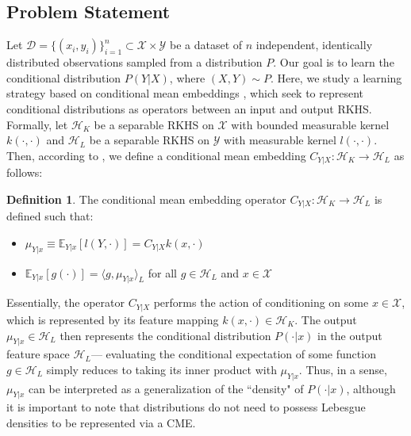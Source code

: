 \documentclass[accepted]{article}
\theoremstyle{definition}
\newtheorem{definition}{Definition}[section]
\begin{document}
\subsection{Problem Statement}
Let $\mathcal{D} = \{(x_i, y_i)\}_{i = 1}^n \subset \mathcal{X} \times \mathcal{Y}$ be a dataset of $n$ independent, identically distributed observations sampled from a distribution $P$. Our goal is to learn the conditional distribution $P(Y|X)$, where $(X, Y) \sim P$. Here, we study a learning strategy based on conditional mean embeddings \citep{song2010nonparametric}, which seek to represent conditional distributions as operators between an input and output RKHS. Formally, let $\mathcal{H}_{K}$ be a separable RKHS on $\mathcal{X}$ with bounded measurable kernel $k(\cdot,  \cdot)$ and $\mathcal{H}_{L}$ be a separable RKHS on $\mathcal{Y}$ with measurable kernel $l(\cdot, \cdot)$. Then, according to \cite{song2009hilbert}, we define a conditional mean embedding $C_{Y|X}: \mathcal{H}_K  \to \mathcal{H}_L$  as follows:
\begin{definition}
\label{CME Def}
The conditional mean embedding operator $C_{Y|X}: \mathcal{H}_K  \to \mathcal{H}_L$ is defined such that:
\begin{itemize}
    \item $\mu_{Y|x} \equiv \mathbb{E}_{Y|x}[l(Y, \cdot)] = C_{Y|X}k(x, \cdot)$
    \item $\mathbb{E}_{Y|x}[g(\cdot)] = \langle g, \mu_{Y|x} \rangle_{L}$ for all $g \in \mathcal{H}_L$ and $x \in \mathcal{X}$
\end{itemize}
\end{definition}
\par Essentially, the operator $C_{Y|X}$ performs the action of conditioning on some $x \in \mathcal{X}$, which is represented by its feature mapping $k(x, \cdot) \in \mathcal{H}_K$. The output $\mu_{Y|x} \in \mathcal{H}_L$ then represents the conditional distribution $P(\cdot|x)$ in the output feature space $\mathcal{H}_L$--- evaluating the conditional expectation of some function $g \in \mathcal{H}_L$ simply reduces to taking its inner product with $\mu_{Y|x}$. Thus, in a sense, $\mu_{Y|x}$ can be interpreted as a generalization of the ``density" of $P(\cdot | x)$, although it is important to note that distributions do not need to possess Lebesgue densities to be represented via a CME. 
\end{document}
